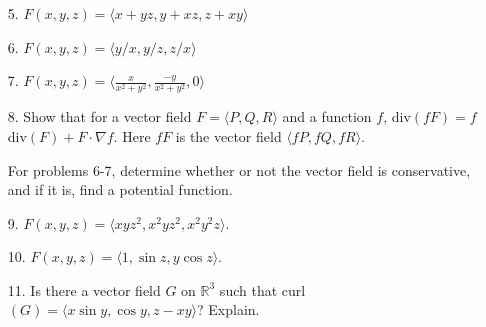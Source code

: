 \documentclass[11 pt]{report}
\begin{document}
\begin{enumerate}
\item[5.] $F(x,y,z) = \langle x+yz, y+xz, z+xy \rangle$

\item[6.] $F(x,y,z) = \langle y/x, y/z, z/x \rangle$

\item[7.] $F(x,y, z) = \langle \frac{x}{x^2+y^2}, \frac{-y}{x^2+y^2}, 0 \rangle $

\item[8.] Show that for a vector field $F = \langle P, Q, R\rangle$ and a function $f$, div$(f F) = f$ div$( F) + F \cdot \nabla f.$ Here $fF$ is the vector field $\langle fP, fQ, fR \rangle$. 

For problems 6-7, determine whether or not the vector field is conservative, and if it is, find a potential function. 

\item[9.] $F(x,y,z) = \langle xyz^2, x^2 y z^2, x^2y^2z \rangle. $

\item[10.] $F(x,y,z) = \langle 1, \sin z, y \cos z \rangle.$

\item[11.] Is there a vector field $G$ on $\mathbb{R}^3$ such that curl$(G) = \langle x \sin y, \cos y, z - xy \rangle$? Explain. 

\end{enumerate}
\end{document}
